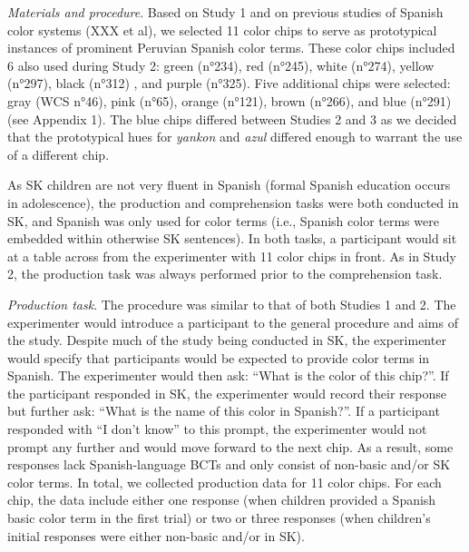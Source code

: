 \documentclass[
  english,
  ,man,floatsintext]{apa6}
\begin{document}
\emph{Materials and procedure}. Based on Study 1 and on previous studies of Spanish color systems (XXX et al), we selected 11 color chips to serve as prototypical instances of prominent Peruvian Spanish color terms. These color chips included 6 also used during Study 2: green (n°234), red (n°245), white (n°274), yellow (n°297), black (n°312) , and purple (n°325). Five additional chips were selected: gray (WCS n°46), pink (n°65), orange (n°121), brown (n°266), and blue (n°291) (see Appendix 1). The blue chips differed between Studies 2 and 3 as we decided that the prototypical hues for \emph{yankon} and \emph{azul} differed enough to warrant the use of a different chip.

As SK children are not very fluent in Spanish (formal Spanish education occurs in adolescence), the production and comprehension tasks were both conducted in SK, and Spanish was only used for color terms (i.e., Spanish color terms were embedded within otherwise SK sentences). In both tasks, a participant would sit at a table across from the experimenter with 11 color chips in front. As in Study 2, the production task was always performed prior to the comprehension task.

\emph{Production task}. The procedure was similar to that of both Studies 1 and 2. The experimenter would introduce a participant to the general procedure and aims of the study. Despite much of the study being conducted in SK, the experimenter would specify that participants would be expected to provide color terms in Spanish. The experimenter would then ask: \enquote{What is the color of this chip?}. If the participant responded in SK, the experimenter would record their response but further ask: \enquote{What is the name of this color in Spanish?}. If a participant responded with \enquote{I don't know} to this prompt, the experimenter would not prompt any further and would move forward to the next chip. As a result, some responses lack Spanish-language BCTs and only consist of non-basic and/or SK color terms. In total, we collected production data for 11 color chips. For each chip, the data include either one response (when children provided a Spanish basic color term in the first trial) or two or three responses (when children's initial responses were either non-basic and/or in SK).
\end{document}
